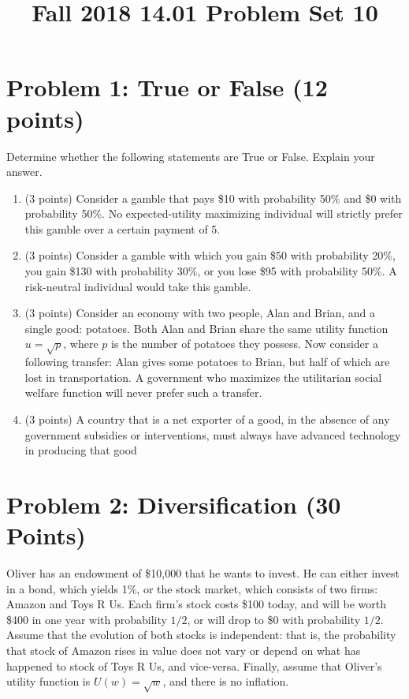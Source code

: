 \documentclass{article}
\begin{document}
\title{Fall 2018 14.01 Problem Set 10}
\maketitle

\section*{Problem 1: True or False (12 points)}
Determine whether the following statements are True or False. Explain your answer.

\begin{enumerate}
\item (3 points) Consider a gamble that pays \$10 with probability 50\% and \$0 with probability 50\%. No expected-utility maximizing individual will strictly prefer this gamble over a certain payment of 5.
\item (3 points) Consider a gamble with which you gain \$50 with probability 20\%, you gain \$130 with probability 30\%, or you lose \$95 with probability 50\%. A risk-neutral individual would take this gamble.
\item (3 points) Consider an economy with two people, Alan and Brian, and a single good: potatoes. Both Alan and Brian share the same utility function $u = \sqrt{p}$, where $p$ is the number of potatoes they possess. Now consider a following transfer: Alan gives some potatoes to Brian, but half of which are lost in transportation. A government who maximizes the utilitarian social welfare function will never prefer such a transfer.
\item (3 points) A country that is a net exporter of a good, in the absence of any government subsidies or interventions, must always have advanced technology in producing that good
\end{enumerate}

\section*{Problem 2: Diversification (30 Points)}
Oliver has an endowment of \$10,000 that he wants to invest. He can either invest in a bond, which yields 1\%, or the stock market, which consists of two firms: Amazon and Toys R Us. Each firm's stock costs \$100 today, and will be worth \$400 in one year with probability $1/2$, or will drop to \$0 with probability $1/2$. Assume that the evolution of both stocks is independent: that is, the probability that stock of Amazon rises in value does not vary or depend on what has happened to stock of Toys R Us, and vice-versa. Finally, assume that Oliver's utility function is $U(w) = \sqrt{w}$, and there is no inflation.
\end{document}
